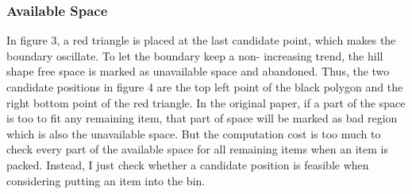 \documentclass[11pt]{article}
\begin{document}
        \subsubsection{Available Space}
        In figure 3, a red triangle is placed at the last candidate point, which makes the boundary oscillate. To let the boundary keep a non- increasing trend, the hill shape free space is marked as unavailable space and abandoned. Thus, the two candidate positions in figure 4 are the top left point of the black polygon and the right bottom point of the red triangle.
        \newline
        In the original paper, if a part of the space is too to fit any remaining item, that part of space will be marked as bad region which is also the unavailable space. But the computation cost is too much to check every part of the available space for all remaining items when an item is packed. Instead, I just check whether a candidate position is feasible when considering putting an item into the bin.
\end{document}
